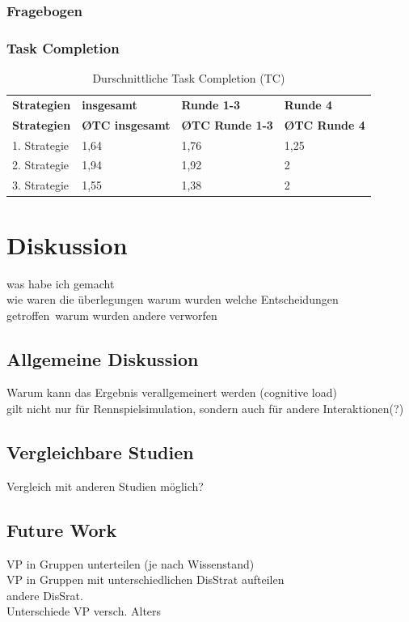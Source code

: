 \documentclass[12pt,a4paper]{scrartcl}
\begin{document}
\subsubsection{Fragebogen}
\subsubsection{Task Completion}
\begin{longtable}{p{3cm}p{3cm}p{3cm}p{3cm} }
	\label{Dialogzeiten}\\
	\caption[Durschnittliche Task Completion (TC)]{Durschnittliche Task Completion (TC)}\\
	\hline
	\textbf{Strategien}&\textbf{insgesamt}&\textbf{Runde 1-3} &\textbf{Runde 4}\\
	\hline
	\endfirsthead
	\hline
	\textbf{Strategien}&\textbf{\O TC insgesamt}&\textbf{\O TC Runde 1-3} &\textbf{\O TC Runde 4}\\
	\hline
	\endhead
1. Strategie & 1,64 & 1,76 & 1,25  \\
2. Strategie & 1,94 & 1,92 & 2  \\
3. Strategie & 1,55 & 1,38 & 2  \\
\hline
\end{longtable}



\section{Diskussion}
was habe ich gemacht\\
wie waren die überlegungen
warum wurden welche Entscheidungen getroffen\
warum wurden andere verworfen
\subsection{Allgemeine Diskussion}
Warum kann das Ergebnis verallgemeinert werden (cognitive load)\\
gilt nicht nur für Rennspielsimulation, sondern auch für andere Interaktionen(?)
\subsection{Vergleichbare Studien}
Vergleich mit anderen Studien möglich?\\
\subsection{Future Work}
VP in Gruppen unterteilen (je nach Wissenstand)\\
VP in Gruppen mit unterschiedlichen DisStrat aufteilen\\
andere DisSrat.\\
Unterschiede VP versch. Alters\\
\end{document}
